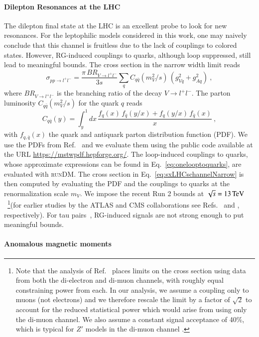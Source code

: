 \documentclass[final,5p,twocolumn]{elsarticle}
\newcommand{\be}{\begin{equation}}
\newcommand{\ee}{\end{equation}}
\newcommand{\Eq}[1]{Eq.~\eqref{#1}}
\newcommand{\Ref}[1]{Ref.~\cite{#1}}
\newcommand{\runDM}{\textsc{runDM}\xspace}
\begin{document}
\paragraph{Dilepton Resonances at the LHC} The dilepton final state at the LHC is an excellent probe to look for new resonances. For the leptophilic models considered in this work, one may naively conclude that this channel is fruitless due to the lack of couplings to colored states. However, RG-induced couplings to quarks, although loop suppressed, still lead to meaningful bounds. The cross section in the narrow width limit reads
\be
\sigma_{p p \rightarrow l^+ l^-} = \frac{\pi \, BR_{V \rightarrow l^+ l^-}}{3 s}  
\sum_{q} C_{q\bar{q}} (m_V^2 / s) \, \left(g_{Vq}^2 + g_{Aq}^2\right) \ ,
\label{eq:sxLHCschannelNarrow}
\ee
where $BR_{V \rightarrow l^+ l^-}$ is the branching ratio of the decay $V \rightarrow l^+ l^-$. The parton luminosity $C_{q\bar{q}} (m_V^2 / s)$ for the quark $q$ reads
\be
C_{q\bar{q}}(y) = \int_{y}^1 d x \, \frac{f_{q}(x) \, f_{\bar{q}}(y / x) + f_{q}(y / x) \, f_{\bar{q}}(x)}{x}  \ ,
\ee
with $f_{q, \bar{q}}(x)$ the quark and antiquark parton distribution function (PDF). We use the PDFs from \Ref{Martin:2009iq} and we evaluate them using the public code available at the URL \href{https://mstwpdf.hepforge.org/}{https://mstwpdf.hepforge.org/}. The loop-induced couplings to quarks, whose approximate expressions can be found in \Eq{eq:onelooptoquarks}, are evaluated with \runDM. The cross section in \Eq{eq:sxLHCschannelNarrow} is then computed by evaluating the PDF and the couplings to quarks at the renormalization scale $m_V$. We impose the recent Run 2 bounds at $\sqrt{s} = 13 \, {\rm TeV}$~\cite{ATLAS:2017wce}\footnote{Note that the analysis of Ref.~\cite{ATLAS:2017wce} places limits on the cross section using data from both the di-electron and di-muon channels, with roughly equal constraining power from each. In our analysis, we assume a coupling only to muons (not electrons) and we therefore rescale the limit by a factor of $\sqrt{2}$ to account for the reduced statistical power which would arise from using only the di-muon channel. We also assume a constant signal acceptance of 40\%, which is typical for $Z'$ models in the di-muon channel \cite{ATLAS:2017wce}.}(for earlier studies by the ATLAS and CMS collaborations see Refs.~\cite{Aaboud:2016cth} and \cite{Khachatryan:2016zqb}, respectively). For tau pairs~\cite{Khachatryan:2016qkc}, RG-induced signals are not strong enough to put meaningful bounds.

\paragraph{Anomalous magnetic moments}
\end{document}
